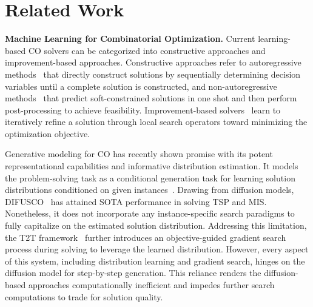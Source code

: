 \section{Related Work}
\textbf{Machine Learning for Combinatorial Optimization.} Current learning-based CO solvers can be categorized into constructive approaches and improvement-based approaches. Constructive approaches refer to autoregressive methods~\cite{khalil2017learning,kool2018attention,kwon2020pomo,hottung2021learning,kim2022sym} that directly construct solutions by sequentially determining decision variables until a complete solution is constructed, and non-autoregressive methods~\cite{joshi2019efficient,fu2021generalize,geisler2022generalization,qiu2022dimes,sun2023difusco,zheng2024learning} that predict soft-constrained solutions in one shot and then perform post-processing to achieve feasibility. Improvement-based solvers~\cite{d2020learning,wu2021learning,chen2019learning,li2021learning,hougeneralize} learn to iteratively refine a solution through local search operators toward minimizing the optimization objective. 



Generative modeling for CO has recently shown promise with its potent representational capabilities and informative distribution estimation. It models the problem-solving task as a conditional generation task for learning solution distributions conditioned on given instances~\cite{hottung2021learning,cheng2022policy,sun2023difusco,du2023hubrouter,zhang2023let,li2023t2t}. Drawing from diffusion models, DIFUSCO~\cite{sun2023difusco} has attained SOTA performance in solving TSP and MIS. Nonetheless, it does not incorporate any instance-specific search paradigms to fully capitalize on the estimated solution distribution. Addressing this limitation, the T2T framework~\cite{li2023t2t} further introduces an objective-guided gradient search process during solving to leverage the learned distribution. However, every aspect of this system, including distribution learning and gradient search, hinges on the diffusion model for step-by-step generation. This reliance renders the diffusion-based approaches computationally inefficient and impedes further search computations to trade for solution quality.

